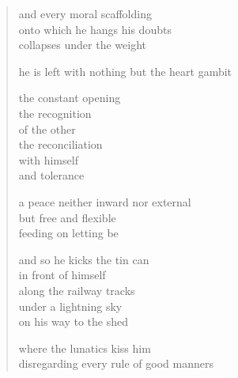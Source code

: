 {\begin{verse}
and every moral scaffolding\\
onto which he hangs his doubts\\
collapses under the weight

he is left with nothing but the heart gambit

the constant opening\\
the recognition\\
of the other\\
the reconciliation\\
with himself\\
and tolerance

a peace neither inward nor external\\
but free and flexible\\
feeding on letting be

and so he kicks the tin can\\
in front of himself\\
along the railway tracks\\
under a lightning sky\\
on his way to the shed

where the lunatics kiss him\\
disregarding every rule of good manners
\end{verse}

}
